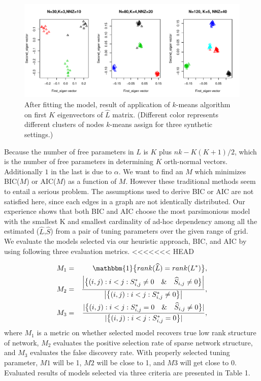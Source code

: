 \documentclass[AMS,STIX1COL]{WileyNJD-v2}
\begin{document}
\begin{figure}[htbp]
\includegraphics[width=1\textwidth]{Fig1.pdf}
\caption{After fitting the model, result of application of $k$-means algorithm on first $K$ eigenvectors of $\widehat{L}$ matrix. (Different color represents different clusters of nodes $k$-means assign for three synthetic settings.) }
\label{fig:figure1}
\end{figure}

Because the number of free parameters in $L$ is $K$ plus $nk - K(K+1)/2$, which is the number of free parameters in determining $K$ orth-normal vectors.
Additionally $1$ in the last is due to $\alpha$.
We want to find an $M$ which minimizes BIC($M$) or AIC($M$) as a function of $M$.
However these traditional methods seem to entail a serious problem.
The assumptions used to derive BIC or AIC are not satisfied here, since each edges in a graph are not identically distributed.
Our experience shows that both BIC and AIC choose the most parsimonious model with the smallest K and smallest cardinality of ad-hoc dependency among all the estimated ($\widehat{L}$,$\widehat{S}$) from a pair of tuning parameters over the given range of grid.
We evaluate the models selected via our heuristic approach, BIC, and AIC by using following three evaluation metrics.
<<<<<<< HEAD

\begin{eqnarray*}
M_1 &=& \mathbbm{1}\big\{rank(\widehat{L}) = rank(L^{*})\big\}, \\
M_2 &=& \frac{\left|\big\{(i,j):i<j:S^{*}_{i,j} \neq0 \quad \& \quad \widehat{S}_{i,j} \neq 0 \big\}\right|}{\left|\big\{(i,j):i<j:S^{*}_{i,j}\neq0\big\}\right|}, \\
M_3 &=& \frac{|\big\{(i,j):i<j:S^{*}_{i,j} = 0 \quad \& \quad \widehat{S}_{i,j} \neq 0 \big\}|}{|\big\{(i,j):i<j:S^{*}_{i,j}=0\big\}|},
\end{eqnarray*}
where $M_1$ is a metric on whether selected model recovers true low rank structure of network,
$M_2$ evaluates the positive selection rate of sparse network structure,
and $M_3$ evaluates the false discovery rate.
With properly selected tuning parameter, $M1$ will be 1, $M2$ will be close to 1, and $M3$ will get close to 0.
Evaluated results of models selected via three criteria are presented in Table 1.
\end{document}
